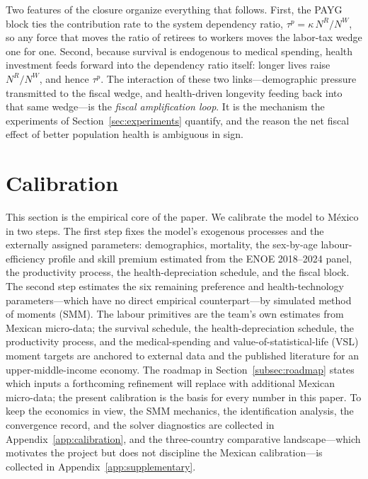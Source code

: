 \documentclass[12pt,a4paper]{article}
\begin{document}
Two features of the closure organize everything that follows. First, the PAYG block ties the contribution rate to the system dependency ratio, $\tau^p = \kappa\,N^R/N^W$, so any force that moves the ratio of retirees to workers moves the labor-tax wedge one for one. Second, because survival is endogenous to medical spending, health investment feeds forward into the dependency ratio itself: longer lives raise $N^R/N^W$, and hence $\tau^p$. The interaction of these two links---demographic pressure transmitted to the fiscal wedge, and health-driven longevity feeding back into that same wedge---is the \emph{fiscal amplification loop}. It is the mechanism the experiments of Section~\ref{sec:experiments} quantify, and the reason the net fiscal effect of better population health is ambiguous in sign.


\section{Calibration}
\label{sec:calibration}

This section is the empirical core of the paper. We calibrate the model to M\'exico in two steps. The first step fixes the model's exogenous processes and the externally assigned parameters: demographics, mortality, the sex-by-age labour-efficiency profile and skill premium estimated from the ENOE 2018--2024 panel, the productivity process, the health-depreciation schedule, and the fiscal block. The second step estimates the six remaining preference and health-technology parameters---which have no direct empirical counterpart---by simulated method of moments (SMM). The labour primitives are the team's own estimates from Mexican micro-data; the survival schedule, the health-depreciation schedule, the productivity process, and the medical-spending and value-of-statistical-life (VSL) moment targets are anchored to external data and the published literature for an upper-middle-income economy. The roadmap in Section~\ref{subsec:roadmap} states which inputs a forthcoming refinement will replace with additional Mexican micro-data; the present calibration is the basis for every number in this paper. To keep the economics in view, the SMM mechanics, the identification analysis, the convergence record, and the solver diagnostics are collected in Appendix~\ref{app:calibration}, and the three-country comparative landscape---which motivates the project but does not discipline the Mexican calibration---is collected in Appendix~\ref{app:supplementary}.
\end{document}
